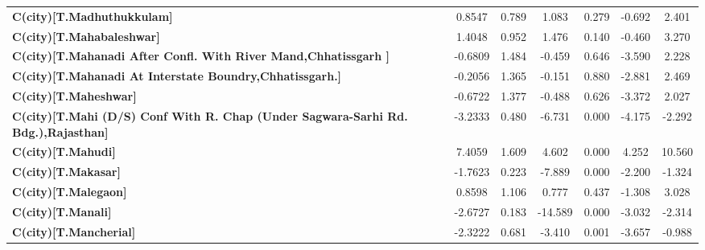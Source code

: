 \begin{center}
\begin{tabular}{lcccccc}
\textbf{C(city)[T.Madhuthukkulam]}                                                                  &       0.8547  &        0.789     &     1.083  &         0.279        &       -0.692    &        2.401     \\
\textbf{C(city)[T.Mahabaleshwar]}                                                                   &       1.4048  &        0.952     &     1.476  &         0.140        &       -0.460    &        3.270     \\
\textbf{C(city)[T.Mahanadi After Confl. With River Mand,Chhatissgarh ]}                             &      -0.6809  &        1.484     &    -0.459  &         0.646        &       -3.590    &        2.228     \\
\textbf{C(city)[T.Mahanadi At Interstate Boundry,Chhatissgarh.]}                                    &      -0.2056  &        1.365     &    -0.151  &         0.880        &       -2.881    &        2.469     \\
\textbf{C(city)[T.Maheshwar]}                                                                       &      -0.6722  &        1.377     &    -0.488  &         0.626        &       -3.372    &        2.027     \\
\textbf{C(city)[T.Mahi (D/S) Conf With R. Chap (Under Sagwara-Sarhi Rd. Bdg.),Rajasthan]}           &      -3.2333  &        0.480     &    -6.731  &         0.000        &       -4.175    &       -2.292     \\
\textbf{C(city)[T.Mahudi]}                                                                          &       7.4059  &        1.609     &     4.602  &         0.000        &        4.252    &       10.560     \\
\textbf{C(city)[T.Makasar]}                                                                         &      -1.7623  &        0.223     &    -7.889  &         0.000        &       -2.200    &       -1.324     \\
\textbf{C(city)[T.Malegaon]}                                                                        &       0.8598  &        1.106     &     0.777  &         0.437        &       -1.308    &        3.028     \\
\textbf{C(city)[T.Manali]}                                                                          &      -2.6727  &        0.183     &   -14.589  &         0.000        &       -3.032    &       -2.314     \\
\textbf{C(city)[T.Mancherial]}                                                                      &      -2.3222  &        0.681     &    -3.410  &         0.001        &       -3.657    &       -0.988     \\

\end{tabular}
\end{center}
